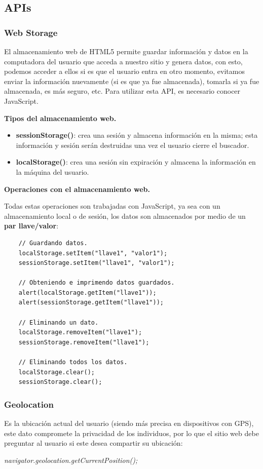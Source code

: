 \subsection{APIs}


\subsubsection{Web Storage}
\hspace{0.55cm}El almacenamiento web de HTML5 permite guardar información y datos en la computadora del usuario que acceda a nuestro sitio y genera datos, con esto, podemos acceder a ellos si es que el usuario entra en otro momento, evitamos enviar la información nuevamente (si es que ya fue almacenada), tomarla si ya fue almacenada, es más seguro, etc. Para utilizar esta API, es necesario conocer JavaScript.

\textbf{Tipos del almacenamiento web.}

\begin{itemize}
    \item \textbf{sessionStorage()}: crea una sesión y almacena información en la misma; esta información y sesión serán destruidas una vez el usuario cierre el buscador.
    \item \textbf{localStorage()}: crea una sesión sin expiración y almacena la información en la máquina del usuario.
\end{itemize}

\textbf{Operaciones con el almacenamiento web.}

Todas estas operaciones son trabajadas con JavaScript, ya sea con un almacenamiento local o de sesión, los datos son almacenados por medio de un \textbf{par llave/valor}:
\begin{lstlisting}
    // Guardando datos.
    localStorage.setItem("llave1", "valor1");
    sessionStorage.setItem("llave1", "valor1");

    // Obteniendo e imprimendo datos guardados.
    alert(localStorage.getItem("llave1"));
    alert(sessionStorage.getItem("llave1"));

    // Eliminando un dato.
    localStorage.removeItem("llave1");
    sessionStorage.removeItem("llave1");

    // Eliminando todos los datos.
    localStorage.clear();
    sessionStorage.clear();
\end{lstlisting}


\subsubsection{Geolocation}
\hspace{0.55cm}Es la ubicación actual del usuario (siendo más precisa en dispositivos con GPS), este dato compromete la privacidad de los individuos, por lo que el sitio web debe preguntar al usuario si este desea compartir su ubicación:
\begin{center}
    \textit{navigator.geolocation.getCurrentPosition();}
\end{center}

